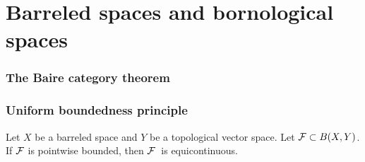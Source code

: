 \documentclass{../crs}
\begin{document}
\chapter{Barreled spaces and bornological spaces}

\subsection{The Baire category theorem}

\subsection{Uniform boundedness principle}
\begin{thm}
Let $X$ be a barreled space and $Y$ be a topological vector space.
Let $\mathcal{F}\subset B(X,Y)$.
If $\mathcal{F}$ is pointwise bounded, then $\mathcal{F}$\ is equicontinuous.
\end{thm}
\end{document}
